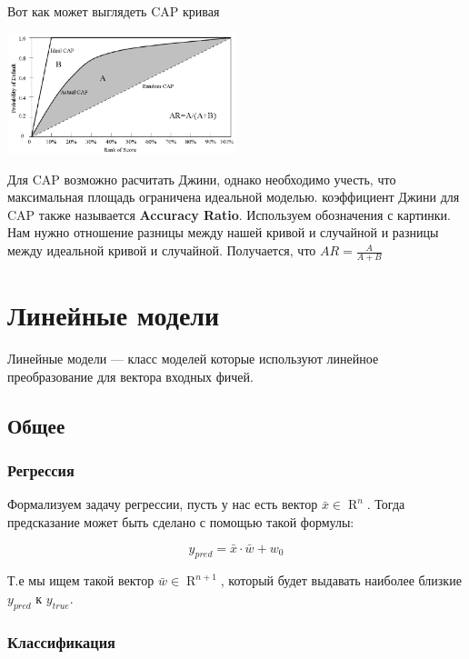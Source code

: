 \documentclass{article}
\begin{document}
    \quad 

    Вот как может выглядеть CAP кривая

    \begin{center}
        \includegraphics[width=0.5\textwidth]{photos/cap.png}
    \end{center}

    Для CAP возможно расчитать Джини, однако необходимо учесть, что максимальная площадь ограничена идеальной моделью. 
    коэффициент Джини для CAP также называется \textbf{Accuracy Ratio}. Используем обозначения с картинки. 
    Нам нужно отношение разницы между нашей кривой и случайной и разницы между идеальной кривой и случайной. 
    Получается, что $AR = \frac{A}{A + B}$

    \section{Линейные модели}

    Линейные модели --- класс моделей которые используют линейное преобразование для вектора входных фичей.

    \subsection{Общее}

    \subsubsection{Регрессия}

    Формализуем задачу регрессии, пусть у нас есть вектор $\bar{x} \in \operatorname{R}^{n}$.
    Тогда предсказание может быть сделано с помощью такой формулы:

    \begin{equation}
        y_{pred} = \bar{x} \cdot \bar{w} + w_{0}
    \end{equation}

    Т.е мы ищем такой вектор $\bar{w} \in \operatorname{R}^{n + 1}$, который будет выдавать наиболее близкие $y_{pred}$ к $y_{true}$.

    \subsubsection{Классификация}
\end{document}

